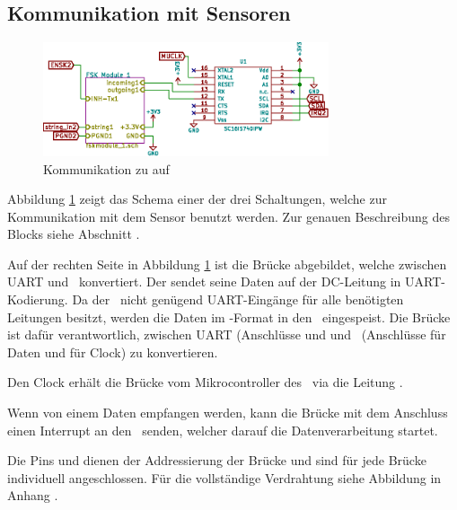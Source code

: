 \subsection{Kommunikation mit Sensoren}
\label{subsec:hw:master:sensorcomm}


\begin{figure}[h!t]
    \centering
    \includegraphics[width=0.75\textwidth]{images/superv-sch/supervisor--sch--comms.eps}
    \caption{Kommunikation zu \Sensor auf \Master}
    \label{fig:sch:master:comms}
\end{figure}


Abbildung  \ref{fig:sch:master:comms}   zeigt  das   Schema  einer   der  drei
Schaltungen,  welche  zur Kommunikation  mit  dem  Sensor benutzt  werden. Zur
genauen  Beschreibung  des   Blocks    siehe  Abschnitt
.

Auf der rechten Seite in Abbildung \ref{fig:sch:master:comms} ist die Br\"ucke
 abgebildet, welche zwischen UART  und \ISC~konvertiert.  Der \Sensor
sendet seine Daten  auf der DC-Leitung in UART-Kodierung. Da  der \Raspi~nicht
gen\"ugend UART-Eing\"ange  f\"ur alle ben\"otigten Leitungen  besitzt, werden
die Daten im \ISC-Format in den \Raspi~eingespeist. Die Br\"ucke  ist
daf\"ur verantwortlich,  zwischen UART  (Anschl\"usse   und 
und \ISC~(Anschl\"usse   f\"ur Daten und   f\"ur Clock) zu
konvertieren.

Den Clock erh\"alt die Br\"ucke vom Mikrocontroller des \Raspi~via die Leitung
.

Wenn  von einem  \Sensor Daten  empfangen werden,  kann die  Br\"ucke mit  dem
Anschluss  einen Interrupt an den \Raspi~senden, welcher darauf die
Datenverarbeitung startet.

Die Pins   und   dienen der  Addressierung der  Br\"ucke und
sind f\"ur  jede Br\"ucke individuell angeschlossen. F\"ur  die vollst\"andige
Verdrahtung siehe Abbildung  in Anhang .

